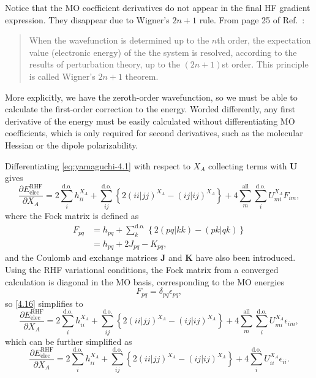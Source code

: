 \documentclass[%
class = book,%
crop = false,%
float = true,%
multi = true,%
preview = false,%
]{standalone}
\let\cite\autocite
\begin{document}
Notice that the MO coefficient derivatives do not appear in the final HF gradient expression. They disappear due to Wigner's \(2n + 1\) rule. From page 25 of Ref.~\parencite{Yamaguchi1994}:
\begin{quote}
  When the wavefunction is determined up to the \(n\)th order, the expectation value (electronic energy) of the the system is resolved, according to the results of perturbation theory, up to the \((2n+1)\)st order. This principle is called Wigner's \(2n+1\) theorem\cite{doi:10.1063/1.1668053,EPSTEIN1980311}.
\end{quote}
More explicitly, we have the zeroth-order wavefunction, so we must be able to calculate the first-order correction to the energy. Worded differently, any first derivative of the energy must be easily calculated without differentiating MO coefficients, which is only required for second derivatives, such as the molecular Hessian or the dipole polarizability.

Differentiating \eqref{eq:yamaguchi-4.1} with respect to \(X_{A}\) collecting terms with \(\mathbf{U}\) gives
\begin{equation}
  \label{4.16}\tag{Yamaguchi eq. 4.16}
  \frac{\partial E_{\text{elec}}^{\text{RHF}}}{\partial X_{A}} = 2 \sum_{i}^{\text{d.o.}} h_{ii}^{X_{A}} + \sum_{ij}^{\text{d.o.}} \left\{ 2(ii|jj)^{X_{A}} - (ij|ij)^{X_{A}} \right\} + 4 \sum_{m}^{\text{all}} \sum_{i}^{\text{d.o.}} U_{mi}^{X_{A}} F_{im},
\end{equation}
where the Fock matrix is defined as
\begin{equation}
  \tag{Yamaguchi eq. 4.6}
  \begin{aligned}
    F_{pq} &= h_{pq} + \sum_{k}^{\text{d.o.}} \left\{ 2(pq|kk) - (pk|qk) \right\} \\
    &= h_{pq} + 2J_{pq} - K_{pq},
  \end{aligned}
\end{equation}
and the Coulomb and exchange matrices \(\mathbf{J}\) and \(\mathbf{K}\) have also been introduced. Using the RHF variational conditions, the Fock matrix from a converged calculation is diagonal in the MO basis, corresponding to the MO energies
\begin{equation}
  F_{pq} = \delta_{pq} \epsilon_{pq}, \tag{Yamaguchi eq. 4.7}
\end{equation}
so \eqref{4.16} simplifies to
\begin{equation}
  \frac{\partial E_{\text{elec}}^{\text{RHF}}}{\partial X_{A}} = 2 \sum_{i}^{\text{d.o.}} h_{ii}^{X_{A}} + \sum_{ij}^{\text{d.o.}} \left\{ 2(ii|jj)^{X_{A}} - (ij|ij)^{X_{A}} \right\} + 4 \sum_{m}^{\text{all}} \sum_{i}^{\text{d.o.}} U_{mi}^{X_{A}} \epsilon_{im}, \tag{Yamaguchi eq. 4.17 modified}
\end{equation}
which can be further simplified as
\begin{equation}
  \frac{\partial E_{\text{elec}}^{\text{RHF}}}{\partial X_{A}} = 2 \sum_{i}^{\text{d.o.}} h_{ii}^{X_{A}} + \sum_{ij}^{\text{d.o.}} \left\{ 2(ii|jj)^{X_{A}} - (ij|ij)^{X_{A}} \right\} + 4 \sum_{i}^{\text{d.o.}} U_{ii}^{X_{A}} \epsilon_{ii}. \tag{Yamaguchi eq. 4.17}
\end{equation}
\end{document}
